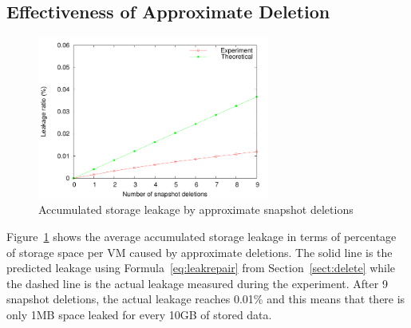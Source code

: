  \subsection{Effectiveness of Approximate Deletion}
 \begin{figure}
     \centering
     \includegraphics[width=3in]{figures/leakage}
     \caption{Accumulated storage leakage by approximate snapshot deletions}
     \label{fig:leakage}
 \end{figure}

Figure~\ref{fig:leakage} shows the average accumulated storage leakage in terms of percentage of
storage space per VM caused  by approximate deletions.
The solid line is the predicted leakage using Formula~\ref{eq:leakrepair} from Section~\ref{sect:delete}
while the dashed line is the actual leakage measured during the experiment.
After 9 snapshot deletions, the actual leakage reaches 0.01\% and this means that
there is only 1MB space leaked for every 10GB of stored data. 
